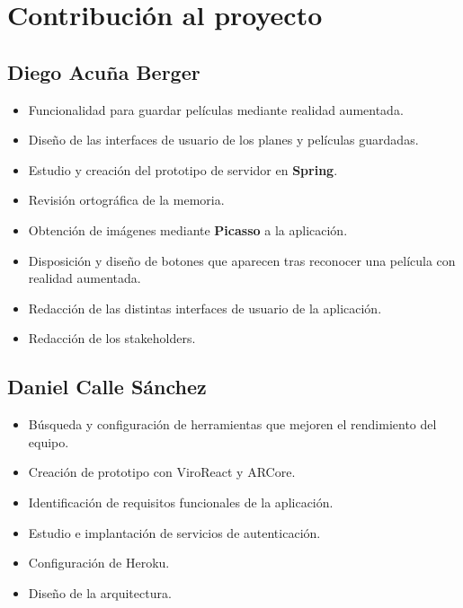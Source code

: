 
\cleardoublepage


\chapter{Contribución al proyecto}
\label{makereference7}

\section{Diego Acuña Berger}
\label{makereference7.1}
\begin{itemize}
    \item Funcionalidad para guardar películas mediante realidad aumentada.
    \item Diseño de las interfaces de usuario de los planes y películas guardadas.  
    \item Estudio y creación del prototipo de servidor en \textbf{Spring}.
    \item Revisión ortográfica de la memoria.
    \item Obtención de imágenes mediante \textbf{Picasso} a la aplicación.
    \item Disposición y diseño de botones que aparecen tras reconocer una película con realidad aumentada.
    \item Redacción de las distintas interfaces de usuario de la aplicación.
    \item Redacción de los stakeholders.
\end{itemize}
\section{Daniel Calle Sánchez}
\label{makereference7.2}
\begin{itemize}  
    \item Búsqueda y configuración de herramientas que mejoren el rendimiento del equipo.
    \item Creación de prototipo con ViroReact y ARCore.
    \item Identificación de requisitos funcionales de la aplicación.
    \item Estudio e implantación de servicios de autenticación.
    \item Configuración de Heroku.
    \item Diseño de la arquitectura.
\end{itemize}

